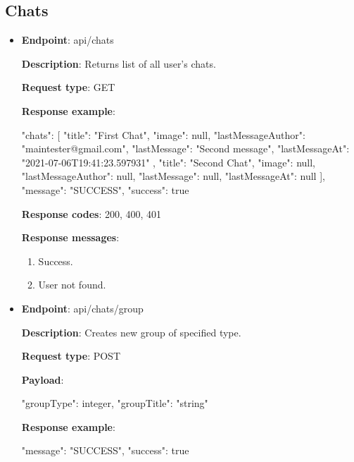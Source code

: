 \subsection{Chats}\label{subsec:chats}
\begin{itemize}
    \item \textbf{Endpoint}: api/chats

    \textbf{Description}: Returns list of all user's chats.

    \textbf{Request type}: GET

    \textbf{Response example}:

    \begin{spverbatim}
    {
        "chats": [
            {
            "title": "First Chat",
            "image": null,
            "lastMessageAuthor": "maintester@gmail.com",
            "lastMessage": "Second message",
            "lastMessageAt": "2021-07-06T19:41:23.597931"
        },
            {
            "title": "Second Chat",
            "image": null,
            "lastMessageAuthor": null,
            "lastMessage": null,
            "lastMessageAt": null
        }
        ],
        "message": "SUCCESS",
        "success": true
    }
    \end{spverbatim}

    \textbf{Response codes}: 200, 400, 401

    \textbf{Response messages}:
    \begin{enumerate}
        \item Success.
        \item User not found.
    \end{enumerate}

    \pagebreak

    \item \textbf{Endpoint}: api/chats/group

    \textbf{Description}: Creates new group of specified type.

    \textbf{Request type}: POST

    \textbf{Payload}:

    \begin{spverbatim}
    {
        "groupType": integer,
        "groupTitle": "string"
    }
    \end{spverbatim}

    \textbf{Response example}:

    \begin{spverbatim}
    {
        "message": "SUCCESS",
        "success": true
    }
    \end{spverbatim}


\end{itemize}
